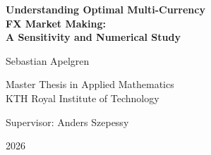\begin{titlepage}
\centering
\vspace*{2cm}

{\huge\bfseries Understanding Optimal Multi-Currency\\[0.3em]
FX Market Making:\\[0.3em]
A Sensitivity and Numerical Study\par}

\vspace{2cm}

{\Large Sebastian Apelgren\par}

\vspace{1cm}

{\large Master Thesis in Applied Mathematics\\
KTH Royal Institute of Technology\par}

\vspace{2cm}

{\large Supervisor: Anders Szepessy\par}

\vfill

{\large 2026\par}

\end{titlepage}
